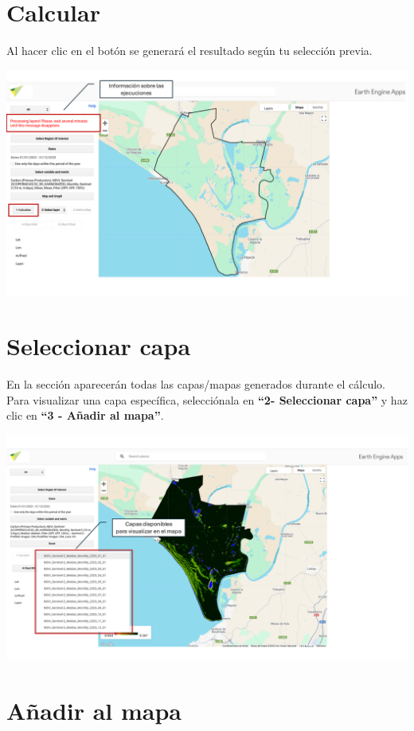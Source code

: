 \documentclass[
]{book}
\begin{document}
\section{\texorpdfstring{\textbf{Calcular}}{Calcular}}\label{calcular}

Al hacer clic en el botón se generará el resultado según tu selección previa.

\includegraphics{assets/message_es.png}

\section{\texorpdfstring{\textbf{Seleccionar capa}}{Seleccionar capa}}\label{seleccionar-capa}

En la sección aparecerán todas las capas/mapas generados durante el cálculo. Para visualizar una capa específica, selecciónala en \textbf{``2- Seleccionar capa''} y haz clic en \textbf{``3 - Añadir al mapa''}.

\includegraphics{assets/layers_es.png}

\section{\texorpdfstring{\textbf{Añadir al mapa}}{Añadir al mapa}}\label{auxf1adir-al-mapa}
\end{document}
